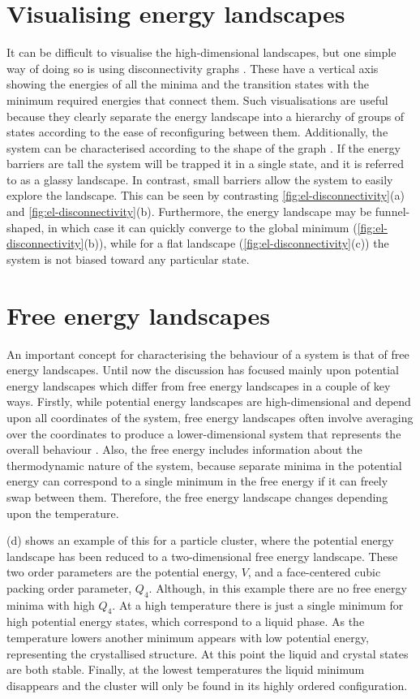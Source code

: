 \section{Visualising energy landscapes}
It can be difficult to visualise the high-dimensional landscapes, but one simple way of doing so is using disconnectivity graphs \cite{Wales2004}.
These have a vertical axis showing the energies of all the minima and the transition states with the minimum required energies that connect them.
Such visualisations are useful because they clearly separate the energy landscape into a hierarchy of groups of states according to the ease of reconfiguring between them.
Additionally, the system can be characterised according to the shape of the graph \cite{Wales1998}.
If the energy barriers are tall the system will be trapped it in a single state, and it is referred to as a glassy landscape.
In contrast, small barriers allow the system to easily explore the landscape.
This can be seen by contrasting \cref{fig:el-disconnectivity}(a) and \cref{fig:el-disconnectivity}(b).
Furthermore, the energy landscape may be funnel-shaped, in which case it can quickly converge to the global minimum (\cref{fig:el-disconnectivity}(b)), while for a flat landscape (\cref{fig:el-disconnectivity}(c)) the system is not biased toward any particular state.

\section{Free energy landscapes}
An important concept for characterising the behaviour of a system is that of free energy landscapes.
Until now the discussion has focused mainly upon potential energy landscapes which differ from free energy landscapes in a couple of key ways.
Firstly, while potential energy landscapes are high-dimensional and depend upon all coordinates of the system, free energy landscapes often involve averaging over the coordinates to produce a lower-dimensional system that represents the overall behaviour \cite{Wales2004}.
Also, the free energy includes information about the thermodynamic nature of the system, because separate minima in the potential energy can correspond to a single minimum in the free energy if it can freely swap between them.
Therefore, the free energy landscape changes depending upon the temperature.

(d) shows an example of this for a particle cluster, where the potential energy landscape has been reduced to a two-dimensional free energy landscape.
These two order parameters are the potential energy, $V$, and a face-centered cubic packing order parameter, $Q_4$.
Although, in this example there are no free energy minima with high $Q_4$.
At a high temperature there is just a single minimum for high potential energy states, which correspond to a liquid phase.
As the temperature lowers another minimum appears with low potential energy, representing the crystallised structure.
At this point the liquid and crystal states are both stable.
Finally, at the lowest temperatures the liquid minimum disappears and the cluster will only be found in its highly ordered configuration.

